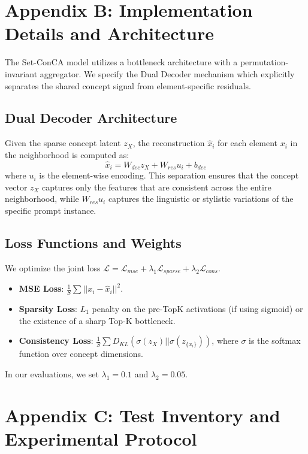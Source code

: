 \documentclass{article}
\begin{document}
\section{Appendix B: Implementation Details and Architecture}
\label{app:implementation}
The Set-ConCA model utilizes a bottleneck architecture with a permutation-invariant aggregator. We specify the Dual Decoder mechanism which explicitly separates the shared concept signal from element-specific residuals.

\subsection{Dual Decoder Architecture}
Given the sparse concept latent $z_X$, the reconstruction $\hat{x}_i$ for each element $x_i$ in the neighborhood is computed as:
\begin{equation}
\hat{x}_i = W_{dec} z_X + W_{res} u_i + b_{dec}
\end{equation}
where $u_i$ is the element-wise encoding. This separation ensures that the concept vector $z_X$ captures only the features that are consistent across the entire neighborhood, while $W_{res} u_i$ captures the linguistic or stylistic variations of the specific prompt instance.

\subsection{Loss Functions and Weights}
We optimize the joint loss $\mathcal{L} = \mathcal{L}_{mse} + \lambda_1 \mathcal{L}_{sparse} + \lambda_2 \mathcal{L}_{cons}$.
\begin{itemize}
    \item \textbf{MSE Loss}: $\frac{1}{S} \sum ||x_i - \hat{x}_i||^2$.
    \item \textbf{Sparsity Loss}: $L_1$ penalty on the pre-TopK activations (if using sigmoid) or the existence of a sharp Top-K bottleneck.
    \item \textbf{Consistency Loss}: $\frac{1}{S} \sum D_{KL}(\sigma(z_X) || \sigma(z_{\{x_i\}}))$, where $\sigma$ is the softmax function over concept dimensions.
\end{itemize}
In our evaluations, we set $\lambda_1 = 0.1$ and $\lambda_2 = 0.05$.

\section{Appendix C: Test Inventory and Experimental Protocol}
\end{document}
